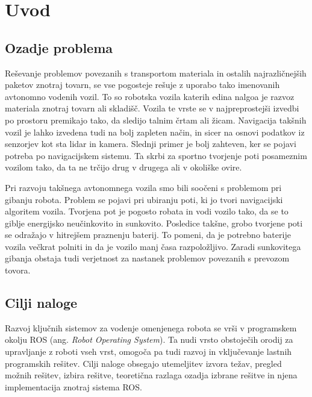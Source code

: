 \chapter{Uvod}\label{cha:uvod}

\section{Ozadje problema}\label{sec:ozadje_problema}

Reševanje problemov povezanih s transportom materiala in ostalih najrazličnejših paketov znotraj tovarn, se vse pogosteje rešuje z uporabo tako imenovanih avtonomno vodenih vozil. To so robotska vozila katerih edina nalgoa je razvoz materiala znotraj tovarn ali skladišč. Vozila te vrste se v najpreprostejši izvedbi po prostoru premikajo tako, da sledijo talnim črtam ali žicam. Navigacija takšnih vozil je lahko izvedena tudi na bolj zapleten način, in sicer na osnovi podatkov iz senzorjev kot sta lidar in kamera. Slednji primer je bolj zahteven, ker se pojavi potreba po navigacijskem sistemu. Ta skrbi za sportno tvorjenje poti posameznim vozilom tako, da ta ne trčijo drug v drugega ali v okoliške ovire.

Pri razvoju takšnega avtonomnega vozila smo bili soočeni s problemom pri gibanju robota. Problem se pojavi pri ubiranju poti, ki jo tvori navigacijski algoritem vozila. Tvorjena pot je pogosto robata in vodi vozilo tako, da se to giblje energijsko neučinkovito in sunkovito. Posledice takšne, grobo tvorjene poti se odražajo v hitrejšem praznenju baterij. To pomeni, da je potrebno baterije vozila večkrat polniti in da je vozilo manj časa razpoložljivo. Zaradi sunkovitega gibanja obstaja tudi verjetnost za nastanek problemov povezanih s prevozom tovora.





\section{Cilji naloge}\label{sec:cilji_naloge}

Razvoj ključnih sistemov za vodenje omenjenega robota se vrši v programskem okolju ROS (ang. \textit{Robot Operating System}). Ta nudi vrsto obstoječih orodij za upravljanje z roboti vseh vrst, omogoča pa tudi razvoj in vključevanje lastnih programskih rešitev. Cilji naloge obsegajo utemeljitev izvora težav, pregled možnih rešitev, izbira rešitve, teoretična razlaga ozadja izbrane rešitve in njena implementacija znotraj sistema ROS.


